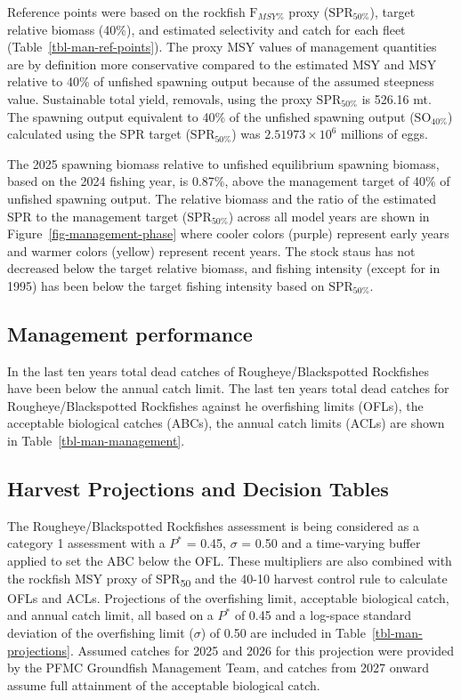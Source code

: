 \documentclass[
]{scrartcl}
\begin{document}
Reference points were based on the rockfish \(\text{F}_{MSY\%}\) proxy
(\(\text{SPR}_{50\%}\)), target relative biomass (40\%), and estimated
selectivity and catch for each fleet (Table~\ref{tbl-man-ref-points}).
The proxy MSY values of management quantities are by definition more
conservative compared to the estimated MSY and MSY relative to 40\% of
unfished spawning output because of the assumed steepness value.
Sustainable total yield, removals, using the proxy \(\text{SPR}_{50\%}\)
is 526.16 mt. The spawning output equivalent to 40\% of the unfished
spawning output (\(\text{SO}_{40\%}\)) calculated using the SPR target
(\(\text{SPR}_{50\%}\)) was \ensuremath{2.51973\times 10^{6}} millions
of eggs.

The 2025 spawning biomass relative to unfished equilibrium spawning
biomass, based on the 2024 fishing year, is 0.87\%, above the management
target of 40\% of unfished spawning output. The relative biomass and the
ratio of the estimated SPR to the management target
(\(\text{SPR}_{50\%}\)) across all model years are shown in
Figure~\ref{fig-management-phase} where cooler colors (purple) represent
early years and warmer colors (yellow) represent recent years. The stock
staus has not decreased below the target relative biomass, and fishing
intensity (except for in 1995) has been below the target fishing
intensity based on \(\text{SPR}_{50\%}\).

\subsection{Management performance}\label{management-performance-1}

In the last ten years total dead catches of Rougheye/Blackspotted
Rockfishes have been below the annual catch limit. The last ten years
total dead catches for Rougheye/Blackspotted Rockfishes against he
overfishing limits (OFLs), the acceptable biological catches (ABCs), the
annual catch limits (ACLs) are shown in Table~\ref{tbl-man-management}.

\subsection{Harvest Projections and Decision
Tables}\label{harvest-projections-and-decision-tables-1}

The Rougheye/Blackspotted Rockfishes assessment is being considered as a
category 1 assessment with a \(P^*\) = 0.45, \(\sigma\) = 0.50 and a
time-varying buffer applied to set the ABC below the OFL. These
multipliers are also combined with the rockfish MSY proxy of
SPR\textsubscript{50} and the 40-10 harvest control rule to calculate
OFLs and ACLs. Projections of the overfishing limit, acceptable
biological catch, and annual catch limit, all based on a \(P^*\) of 0.45
and a log-space standard deviation of the overfishing limit (\(\sigma\))
of 0.50 are included in Table~\ref{tbl-man-projections}. Assumed catches
for 2025 and 2026 for this projection were provided by the PFMC
Groundfish Management Team, and catches from 2027 onward assume full
attainment of the acceptable biological catch.
\end{document}
